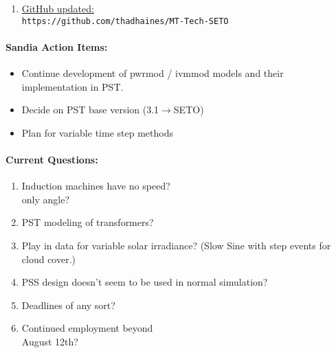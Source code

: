 \documentclass[12pt]{article}
\begin{document}
\begin{multicols}{2}
\begin{enumerate}
		\item \href{https://github.com/thadhaines/MT-Tech-SETO}{GitHub updated:}\\
	{\footnotesize \verb|https://github.com/thadhaines/MT-Tech-SETO| }\\
	\end{enumerate}
	

\paragraph{Sandia Action Items:}
	\begin{itemize}
		\itemsep 0em 
			\item Continue development of pwrmod / ivmmod models and their implementation in PST.
			\item Decide on PST base version (3.1$\longrightarrow$SETO)
			\item Plan for variable time step methods
	\end{itemize}
	
\paragraph{Current Questions:}
	\begin{enumerate}
	\itemsep0em 
	
	
	\item Induction machines have no speed?\\ only angle?
	\item PST modeling of transformers?
	\item Play in data for variable solar irradiance? (Slow Sine with step events for cloud cover.)
	\item PSS design doesn't seem to be used in normal simulation?
	\item Deadlines of any sort?
	\item Continued employment beyond \\August 12th?
	\end{enumerate}


\end{multicols}
\end{document}
